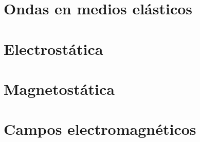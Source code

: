 \documentclass[a4paper]{book}
\begin{document}
\section{Ondas en medios elásticos}

\section{Electrostática}

\section{Magnetostática}

\section{Campos electromagnéticos}
\end{document}
